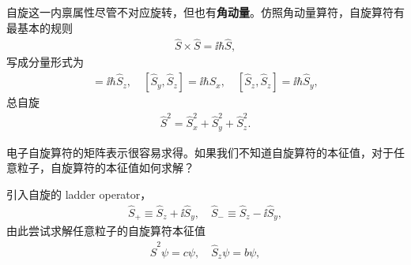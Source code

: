 
自旋这一内禀属性尽管不对应旋转，但也有\textbf{角动量}。仿照角动量算符，自旋算符有最基本的规则
\begin{align}
    \hat S \times \hat S = \ii \hbar \hat S,
\end{align}
写成分量形式为
\begin{align}
[\hat S_x, \hat S_y] = \ii\hbar \hat S_z, \quad
[\hat S_y, \hat S_z] = \ii\hbar \hat S_x, \quad
[\hat S_z, \hat S_z] = \ii\hbar \hat S_y,
\label{eq:spin_bb_2}
\end{align}
总自旋
\begin{align}
    \hat S^2 = \hat S_x^2 + \hat S_y^2 + \hat S_z^2. 
    \label{eq:spin_bb_1}
\end{align}

电子自旋算符的矩阵表示很容易求得。如果我们不知道自旋算符的本征值，对于任意粒子，自旋算符的本征值如何求解？

引入自旋的 ladder operator，
\begin{align}
    \hat S_+ \equiv \hat S_z + \ii \hat S_y, \quad \hat S_- \equiv \hat S_z - \ii \hat S_y, 
    \label{eq:spin_bb_4}
\end{align}
由此尝试求解任意粒子的自旋算符本征值
\begin{align}
    \hat S^2 \psi = c \psi, \quad \hat S_z \psi = b \psi, 
    \label{eq:spin_bb_10}
\end{align}

